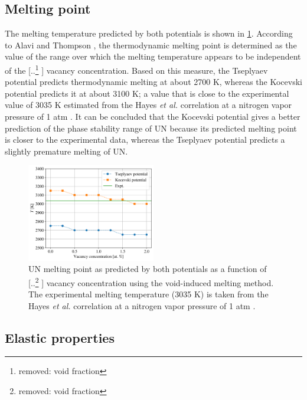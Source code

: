 \documentclass[preprint, 12pt]{elsarticle}
\providecommand{\DIFaddtex}[1]{{\protect\color{blue} \sf #1}} %
\providecommand{\DIFdeltex}[1]{{\protect\color{red} [..\footnote{removed: #1} ]}} %
\providecommand{\DIFaddbegin}{} %
\providecommand{\DIFaddend}{} %
\providecommand{\DIFdelbegin}{} %
\providecommand{\DIFdelend}{} %
\providecommand{\DIFaddFL}[1]{\DIFadd{#1}} %
\providecommand{\DIFdelFL}[1]{\DIFdel{#1}} %
\providecommand{\DIFaddbeginFL}{} %
\providecommand{\DIFaddendFL}{} %
\providecommand{\DIFdelbeginFL}{} %
\providecommand{\DIFdelendFL}{} %
\providecommand{\DIFadd}[1]{\texorpdfstring{\DIFaddtex{#1}}{#1}} %
\providecommand{\DIFdel}[1]{\texorpdfstring{\DIFdeltex{#1}}{}} %
\newcommand{\DIFscaledelfig}{0.5}
\newlength{\DIFdelgraphicswidth} %
\newlength{\DIFdelgraphicsheight} %
\newcommand{\DIFaddincludegraphics}[2][]{{\color{blue}\fbox{\DIFOincludegraphics[#1]{#2}}}} %
\newcommand{\DIFdelincludegraphics}[2][]{%
\sbox{\DIFdelgraphicsbox}{\DIFOincludegraphics[#1]{#2}}%
\settoboxwidth{\DIFdelgraphicswidth}{\DIFdelgraphicsbox} %
\settoboxtotalheight{\DIFdelgraphicsheight}{\DIFdelgraphicsbox} %
\scalebox{\DIFscaledelfig}{%
\parbox[b]{\DIFdelgraphicswidth}{\usebox{\DIFdelgraphicsbox}\\[-\baselineskip] \rule{\DIFdelgraphicswidth}{0em}}\llap{\resizebox{\DIFdelgraphicswidth}{\DIFdelgraphicsheight}{%
\setlength{\unitlength}{\DIFdelgraphicswidth}%
\begin{picture}(1,1)%
\thicklines\linethickness{2pt} %
{\color[rgb]{1,0,0}\put(0,0){\framebox(1,1){}}}%
{\color[rgb]{1,0,0}\put(0,0){\line( 1,1){1}}}%
{\color[rgb]{1,0,0}\put(0,1){\line(1,-1){1}}}%
\end{picture}%
}\hspace*{3pt}}} %
} %
\DeclareRobustCommand{\DIFaddbegin}{\DIFOaddbegin \let\includegraphics\DIFaddincludegraphics} %
\DeclareRobustCommand{\DIFaddend}{\DIFOaddend \let\includegraphics\DIFOincludegraphics} %
\DeclareRobustCommand{\DIFdelbegin}{\DIFOdelbegin \let\includegraphics\DIFdelincludegraphics} %
\DeclareRobustCommand{\DIFdelend}{\DIFOaddend \let\includegraphics\DIFOincludegraphics} %
\DeclareRobustCommand{\DIFaddbeginFL}{\DIFOaddbeginFL \let\includegraphics\DIFaddincludegraphics} %
\DeclareRobustCommand{\DIFaddendFL}{\DIFOaddendFL \let\includegraphics\DIFOincludegraphics} %
\DeclareRobustCommand{\DIFdelbeginFL}{\DIFOdelbeginFL \let\includegraphics\DIFdelincludegraphics} %
\DeclareRobustCommand{\DIFdelendFL}{\DIFOaddendFL \let\includegraphics\DIFOincludegraphics} %
\begin{document}
\subsection{Melting point}

The melting temperature predicted by both potentials is shown in \cref{Fig:Tm}. According to Alavi and Thompson \cite{Alavi2006}, the thermodynamic melting point is determined as the value of the range over which the melting temperature appears to be independent of the \DIFdelbegin \DIFdel{void fraction}\DIFdelend \DIFaddbegin \DIFadd{vacancy concentration}\DIFaddend . Based on this measure, the Tseplyaev potential predicts thermodynamic melting at about 2700 K, whereas the Kocevski potential predicts it at about 3100 K; a value that is close to the experimental value of 3035 K estimated from the Hayes \textit{et al.} correlation at a nitrogen vapor pressure of 1 atm \cite{Hayes1990IV}. It can be concluded that the Kocevski potential gives a better prediction of the phase stability range of UN because its predicted melting point is closer to the experimental data, whereas the Tseplyaev potential predicts a slightly premature melting of UN.

\begin{figure}[h!]
\centering
\includegraphics[width=0.5\textwidth]{Tm.png}
\caption{UN melting point as predicted by both potentials as a function of \DIFdelbeginFL \DIFdelFL{void fraction }\DIFdelendFL \DIFaddbeginFL \DIFaddFL{vacancy concentration }\DIFaddendFL using the void-induced melting method. The experimental melting temperature (3035 K) is taken from the Hayes \textit{et al.} correlation at a nitrogen vapor pressure of 1 atm \cite{Hayes1990IV}.}
\label{Fig:Tm}
\end{figure}



\subsection{Elastic properties}
\label{Sec:Elastic}
\end{document}
